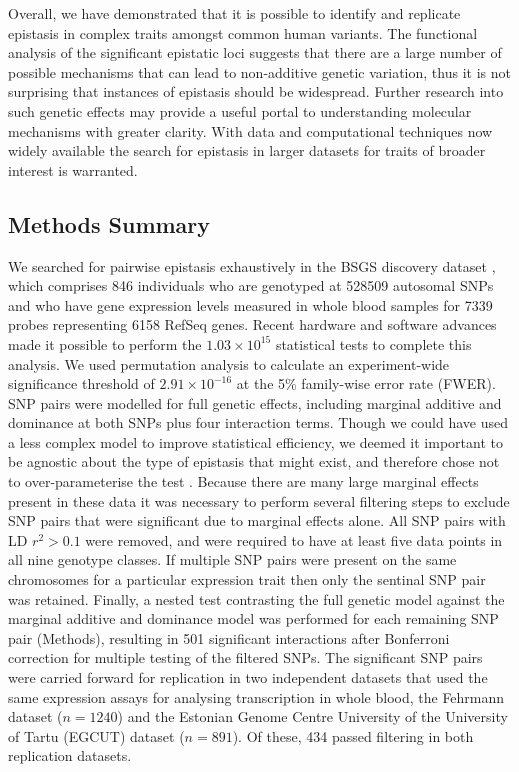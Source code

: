 \documentclass{article}
\begin{document}
Overall, we have demonstrated that it is possible to identify and replicate epistasis in complex traits amongst common human variants. The functional analysis of the significant epistatic loci suggests that there are a large number of possible mechanisms that can lead to non-additive genetic variation, thus it is not surprising that instances of epistasis should be widespread. Further research into such genetic effects may provide a useful portal to understanding molecular mechanisms with greater clarity. With data and computational techniques now widely available the search for epistasis in larger datasets for traits of broader interest is warranted.


\subsection{Methods Summary}
We searched for pairwise epistasis exhaustively in the BSGS discovery dataset \cite{Powell2012}, which comprises 846 individuals who are genotyped at 528509 autosomal SNPs and who have gene expression levels measured in whole blood samples for 7339 probes representing 6158 RefSeq genes. Recent hardware and software \cite{Hemani2011} advances made it possible to perform the $1.03 \times 10^{15}$ statistical tests to complete this analysis. We used permutation analysis \cite{Churchill1994a} to calculate an experiment-wide significance threshold of $2.91 \times 10^{-16}$ at the 5\% family-wise error rate (FWER). SNP pairs were modelled for full genetic effects, including marginal additive and dominance at both SNPs plus four interaction terms. Though we could have used a less complex model to improve statistical efficiency, we deemed it important to be agnostic about the type of epistasis that might exist, and therefore chose not to over-parameterise the test \cite{Marchini2005, Hemani2013}. Because there are many large marginal effects present in these data it was necessary to perform several filtering steps to exclude SNP pairs that were significant due to marginal effects alone. All SNP pairs with LD $r^2 > 0.1$ were removed, and were required to have at least five data points in all nine genotype classes. If multiple SNP pairs were present on the same chromosomes for a particular expression trait then only the sentinal SNP pair was retained. Finally, a nested test contrasting the full genetic model against the marginal additive and dominance model was performed for each remaining SNP pair (Methods), resulting in 501 significant interactions after Bonferroni correction for multiple testing of the filtered SNPs. The significant SNP pairs were carried forward for replication in two independent datasets that used the same expression assays for analysing transcription in whole blood, the Fehrmann dataset \cite{Fehrmann2011} ($n=1240$) and the Estonian Genome Centre University of the University of Tartu (EGCUT) dataset \cite{Metspalu2004} ($n=891$). Of these, 434 passed filtering in both replication datasets.
\end{document}

